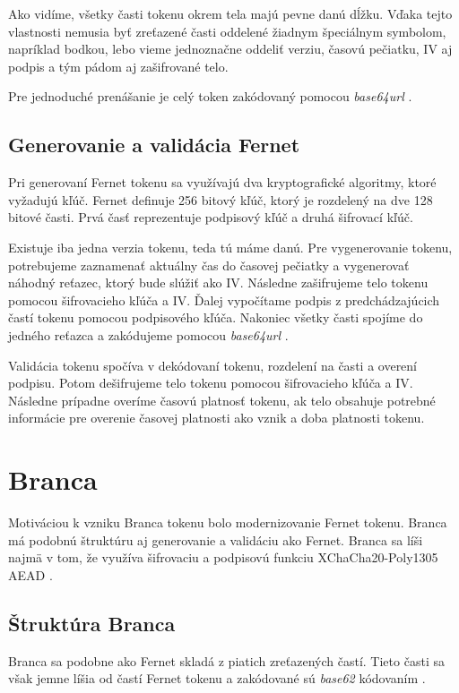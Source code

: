 Ako vidíme, všetky časti tokenu okrem tela majú pevne danú dĺžku. Vďaka tejto vlastnosti nemusia byť zreťazené časti oddelené žiadnym špeciálnym symbolom, napríklad bodkou, lebo vieme jednoznačne oddeliť verziu, časovú pečiatku, IV aj podpis a tým pádom aj zašifrované telo.

Pre jednoduché prenášanie je celý token zakódovaný pomocou \textit{base64url} \cite{base64_rfc}.

\subsection{Generovanie a validácia Fernet}

Pri generovaní Fernet tokenu sa využívajú dva kryptografické algoritmy, ktoré vyžadujú kľúč. Fernet definuje 256 bitový kľúč, ktorý je rozdelený na dve 128 bitové časti. Prvá časť reprezentuje podpisový kľúč a druhá šifrovací kľúč.

Existuje iba jedna verzia tokenu, teda tú máme danú. Pre vygenerovanie tokenu, potrebujeme zaznamenať aktuálny čas do časovej pečiatky a vygenerovať náhodný reťazec, ktorý bude slúžiť ako IV. Následne zašifrujeme telo tokenu pomocou šifrovacieho kľúča a IV. Ďalej vypočítame podpis z predchádzajúcich častí tokenu pomocou podpisového kľúča. Nakoniec všetky časti spojíme do jedného reťazca a zakódujeme pomocou \textit{base64url} \cite{base64_rfc}.

Validácia tokenu spočíva v dekódovaní tokenu, rozdelení na časti a overení podpisu. Potom dešifrujeme telo tokenu pomocou šifrovacieho kľúča a IV. Následne prípadne overíme časovú platnosť tokenu, ak telo obsahuje potrebné informácie pre overenie časovej platnosti ako vznik a doba platnosti tokenu.

\section{Branca}

Motiváciou k vzniku Branca tokenu bolo modernizovanie Fernet tokenu. Branca má podobnú štruktúru aj generovanie a validáciu ako Fernet. Branca sa líši najmä v tom, že využíva šifrovaciu a podpisovú funkciu XChaCha20-Poly1305 AEAD \cite{chacha_poly}.

\subsection{Štruktúra Branca}

Branca sa podobne ako Fernet skladá z piatich zreťazených častí. Tieto časti sa však jemne líšia od častí Fernet tokenu a zakódované sú \textit{base62} kódovaním \cite{base62}.


